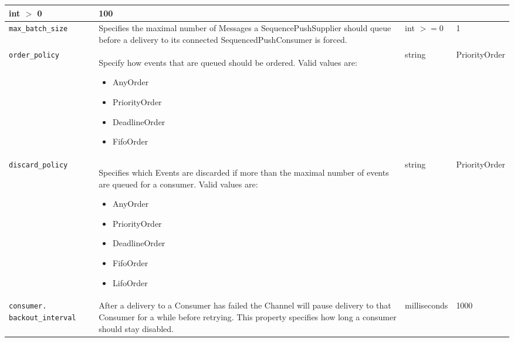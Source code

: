 \begin{small}
\begin{longtable}{|p{5cm}|p{7.5cm}|p{1.5cm}|p{1.5cm}|}
    int $>$ 0 & 100 \\ \hline

    \verb"max_batch_size" &

    Specifies the maximal number of Messages a SequencePushSupplier should
    queue before a delivery to its connected SequencedPushConsumer is
    forced. &

    int $>=0$ & 1 \\ \hline

    \verb"order_policy" &

    Specify how events that are queued should be ordered. Valid values
    are: 
    \begin{itemize}
    \item AnyOrder

    \item PriorityOrder

    \item DeadlineOrder

    \item FifoOrder
    \end{itemize} & 

    string & Priority\-Order \\ \hline

    \verb"discard_policy" &

    Specifies which Events are discarded if more than the  
    maximal number of events are queued for a consumer. 
    Valid values are:
    \begin{itemize}
    \item AnyOrder

    \item PriorityOrder

    \item DeadlineOrder

    \item FifoOrder

    \item LifoOrder
    \end{itemize} &

    string & Priority\-Order \\ \hline
       
    \verb"consumer."
    \verb"backout_interval" &

    After a delivery to a Consumer has failed the Channel will pause
    delivery to that Consumer for a while before retrying. This property
    specifies how long a consumer should stay disabled. &

    milli\-seconds & 1000 \\ \hline


\end{longtable}
\end{small}
